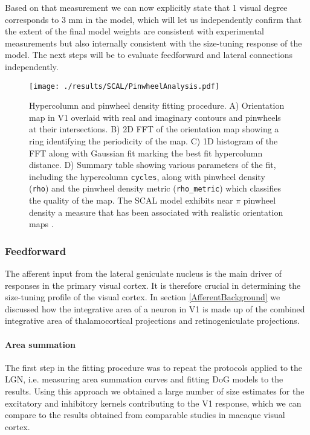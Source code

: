 Based on that measurement we can now explicitly state that 1 visual
degree corresponds to 3 mm in the model, which will let us
independently confirm that the extent of the final model weights are
consistent with experimental measurements but also internally
consistent with the size-tuning response of the model. The next steps
will be to evaluate feedforward and lateral connections independently.

\begin{figure}
	\centering
        \texttt{[image: ./results/SCAL/PinwheelAnalysis.pdf]}
	\caption[Hypercolumn and pinwheel density fitting procedure and
      results.]{Hypercolumn and pinwheel density fitting procedure. A)
      Orientation map in V1 overlaid with real and imaginary contours
      and pinwheels at their intersections. B) 2D FFT of the
      orientation map showing a ring identifying the periodicity of
      the map. C) 1D histogram of the FFT along with Gaussian fit
      marking the best fit hypercolumn distance. D) Summary table
      showing various parameters of the fit, including the hypercolumn
      \texttt{cycles}, along with pinwheel density (\texttt{rho}) and
      the pinwheel density metric (\texttt{rho\_metric}) which
      classifies the quality of the map. The SCAL model exhibits near
      $\pi$ pinwheel density a measure that has been associated with
      realistic orientation maps \citep{Kaschube2010, Stevens2013}.}
	\label{SCALhypercolumns}
\end{figure}

\subsubsection*{Feedforward}

The afferent input from the lateral geniculate nucleus is the main
driver of responses in the primary visual cortex. It is therefore
crucial in determining the size-tuning profile of the visual cortex.
In section \ref{AfferentBackground} we discussed how the integrative
area of a neuron in V1 is made up of the combined integrative area of
thalamocortical projections and retinogeniculate projections.

\paragraph{Area summation}

The first step in the fitting procedure was to repeat the protocols
applied to the LGN, i.e. measuring area summation curves and fitting
DoG models to the results. Using this approach we obtained a large
number of size estimates for the excitatory and inhibitory kernels
contributing to the V1 response, which we can compare to the results
obtained from comparable studies in macaque visual cortex.

